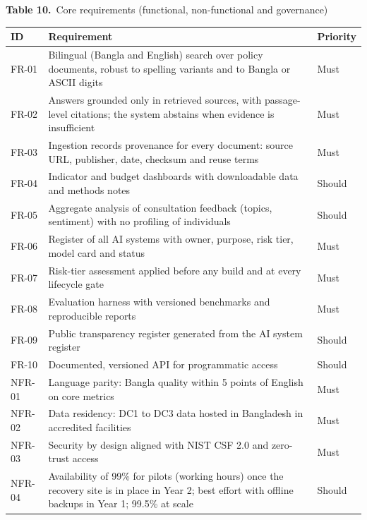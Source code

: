 \documentclass[border=10pt]{standalone}
\begin{document}
\begin{minipage}{17cm}
{\large\bfseries Table 10.}\ {\large Core requirements (functional, non-functional and governance)}\par\vspace{7pt}
\small
{}
\begin{tabularx}{\linewidth}{@{}>{\hsize=0.422\hsize\raggedright\arraybackslash}X>{\hsize=2.156\hsize\raggedright\arraybackslash}X>{\hsize=0.422\hsize\raggedright\arraybackslash}X@{}}
\arrayrulecolor{bapilrule}\toprule
\rowcolor{white}\textbf{ID} & \textbf{Requirement} & \textbf{Priority} \\
\midrule
FR-01 & Bilingual (Bangla and English) search over policy documents, robust to spelling variants and to Bangla or ASCII digits & Must \\
FR-02 & Answers grounded only in retrieved sources, with passage-level citations; the system abstains when evidence is insufficient & Must \\
FR-03 & Ingestion records provenance for every document: source URL, publisher, date, checksum and reuse terms & Must \\
FR-04 & Indicator and budget dashboards with downloadable data and methods notes & Should \\
FR-05 & Aggregate analysis of consultation feedback (topics, sentiment) with no profiling of individuals & Should \\
FR-06 & Register of all AI systems with owner, purpose, risk tier, model card and status & Must \\
FR-07 & Risk-tier assessment applied before any build and at every lifecycle gate & Must \\
FR-08 & Evaluation harness with versioned benchmarks and reproducible reports & Must \\
FR-09 & Public transparency register generated from the AI system register & Should \\
FR-10 & Documented, versioned API for programmatic access & Should \\
NFR-01 & Language parity: Bangla quality within 5 points of English on core metrics & Must \\
NFR-02 & Data residency: DC1 to DC3 data hosted in Bangladesh in accredited facilities & Must \\
NFR-03 & Security by design aligned with NIST CSF 2.0 and zero-trust access & Must \\
NFR-04 & Availability of 99\% for pilots (working hours) once the recovery site is in place in Year 2; best effort with offline backups in Year 1; 99.5\% at scale & Should \\

\end{tabularx}
\end{minipage}
\end{document}
